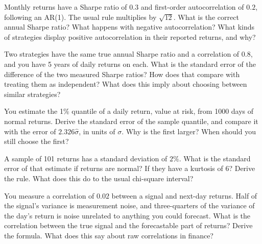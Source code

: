 \begin{question}\label{iq:iv1:statistics:32}
Monthly returns have a Sharpe ratio of $0.3$ and first-order autocorrelation of $0.2$, following an AR(1). The usual rule multiplies by $\sqrt{12}$. What is the correct annual Sharpe ratio? What happens with negative autocorrelation? What kinds of strategies display positive autocorrelation in their reported returns, and why?
\end{question}

\begin{question}\label{iq:iv1:statistics:33}
Two strategies have the same true annual Sharpe ratio and a correlation of $0.8$, and you have 5 years of daily returns on each. What is the standard error of the difference of the two measured Sharpe ratios? How does that compare with treating them as independent? What does this imply about choosing between similar strategies?
\end{question}

\begin{question}\label{iq:iv1:statistics:34}
You estimate the 1\% quantile of a daily return, value at risk, from 1000 days of normal returns. Derive the standard error of the sample quantile, and compare it with the error of $2.326\hat{\sigma}$, in units of $\sigma$. Why is the first larger? When should you still choose the first?
\end{question}

\begin{question}\label{iq:iv1:statistics:35}
A sample of 101 returns has a standard deviation of $2\%$. What is the standard error of that estimate if returns are normal? If they have a kurtosis of 6? Derive the rule. What does this do to the usual chi-square interval?
\end{question}

\begin{question}\label{iq:iv1:statistics:36}
You measure a correlation of $0.02$ between a signal and next-day returns. Half of the signal's variance is measurement noise, and three-quarters of the variance of the day's return is noise unrelated to anything you could forecast. What is the correlation between the true signal and the forecastable part of returns? Derive the formula. What does this say about raw correlations in finance?
\end{question}

